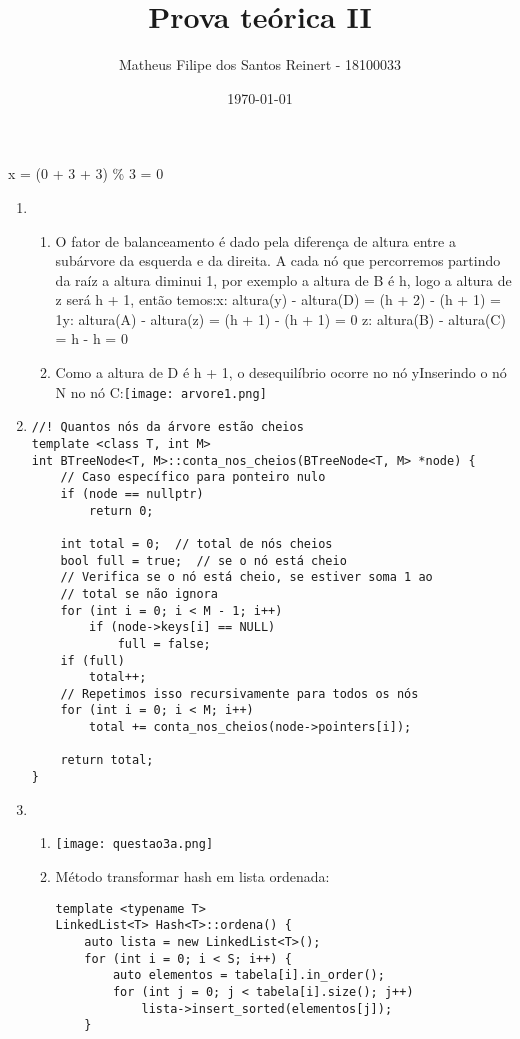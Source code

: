 \documentclass[12pt, letterpaper]{article}
\title{Prova teórica II}
\author{Matheus Filipe dos Santos Reinert - 18100033}
\date{\today}
\begin{document}
    \maketitle
    x = (0 + 3 + 3) \% 3 = 0
    \begin{enumerate}
        \item
        \begin{enumerate}
\item{O fator de balanceamento é dado pela diferença de altura entre a subárvore da esquerda e da direita. 
A cada nó que percorremos partindo da raíz a altura diminui 1, por exemplo a altura de B é h, logo a altura 
de z será h + 1, então temos:\newline\newline x: altura(y) - altura(D) = (h + 2) - (h + 1) = 1\newline y: altura(A) 
- altura(z) = (h + 1) - (h + 1) = 0 \newline z: altura(B) - altura(C) = h - h = 0}

\item{Como a altura de D é h + 1, o desequilíbrio ocorre no nó y\newline\newline Inserindo o nó N no nó C:\newline\texttt{[image: arvore1.png]}\newline\newline\newline\newline}
        \end{enumerate}
        
        \item
\begin{lstlisting}
//! Quantos nós da árvore estão cheios
template <class T, int M>
int BTreeNode<T, M>::conta_nos_cheios(BTreeNode<T, M> *node) {
    // Caso específico para ponteiro nulo
    if (node == nullptr)
        return 0;

    int total = 0;  // total de nós cheios
    bool full = true;  // se o nó está cheio
    // Verifica se o nó está cheio, se estiver soma 1 ao
    // total se não ignora
    for (int i = 0; i < M - 1; i++)
        if (node->keys[i] == NULL)
            full = false;
    if (full)
        total++;
    // Repetimos isso recursivamente para todos os nós
    for (int i = 0; i < M; i++)
        total += conta_nos_cheios(node->pointers[i]);

    return total;
}
\end{lstlisting}
    \item
    \begin{enumerate}
        \item\texttt{[image: questao3a.png]}
        \item
        Método transformar hash em lista ordenada:
        \begin{lstlisting}
template <typename T>
LinkedList<T> Hash<T>::ordena() {
    auto lista = new LinkedList<T>();
    for (int i = 0; i < S; i++) {
        auto elementos = tabela[i].in_order();
        for (int j = 0; j < tabela[i].size(); j++)
            lista->insert_sorted(elementos[j]);
    }


\end{lstlisting}
\end{enumerate}
\end{enumerate}
\end{document}
